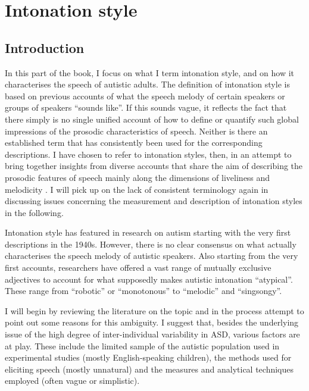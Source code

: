\chapter{Intonation style} \label{intonationstyle}

\section{Introduction}\label{sec:int_intro}

In this part of the book, I focus on what I term intonation style, and on how it characterises the speech of autistic adults. The definition of intonation style is based on previous accounts of what the speech melody of certain speakers or groups of speakers ``sounds like''. If this sounds vague, it reflects the fact that there simply is no single unified account of how to define or quantify such global impressions of the prosodic characteristics of speech. Neither is there an established term that has consistently been used for the corresponding descriptions. I have chosen to refer to intonation styles, then, in an attempt to bring together insights from diverse accounts that share the aim of describing the prosodic features of speech mainly along the dimensions of liveliness and melodicity \citep[a term used in related work by][]{hindRegularityMelodicityStereotyping1999,hindMetricalPatternsMelodicity2002}. I will pick up on the lack of consistent terminology again in discussing issues concerning the measurement and description of intonation styles in the following.

Intonation style has featured in research on autism starting with the very first descriptions in the 1940s. However, there is no clear consensus on what actually characterises the speech melody of autistic speakers. Also starting from the very first accounts, researchers have offered a vast range of mutually exclusive adjectives to account for what supposedly makes autistic intonation ``atypical''. These range from ``robotic'' or ``monotonous'' to ``melodic'' and ``singsongy''.

I will begin by reviewing the literature on the topic and in the process attempt to point out some reasons for this ambiguity. I suggest that, besides the underlying issue of the high degree of inter-individual variability in ASD, various factors are at play. These include the limited sample of the autistic population used in experimental studies (mostly English-speaking children), the methods used for eliciting speech (mostly unnatural) and the measures and analytical techniques employed (often vague or simplistic).

